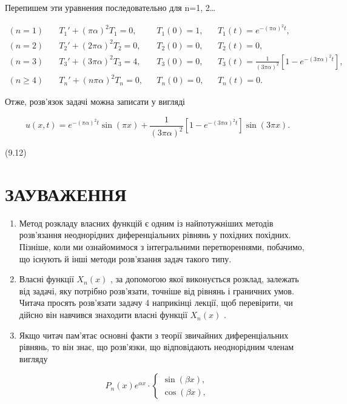 \documentclass[
  ukrainian,
]{article}
\begin{document}
Перепишем эти уравнения последовательно для n=1, 2\ldots{}

\[
\begin{aligned}
(n=1)\quad & T_1' + (\pi\alpha)^2 T_1 = 0, && T_1(0) = 1, && T_1(t) = e^{-(\pi\alpha)^2 t}, \\
(n=2)\quad & T_2' + (2\pi\alpha)^2 T_2 = 0, && T_2(0) = 0, && T_2(t) = 0, \\
(n=3)\quad & T_3' + (3\pi\alpha)^2 T_3 = 4, && T_3(0) = 0, && T_3(t) = \frac{1}{(3\pi\alpha)^2}\left[1 - e^{-(3\pi\alpha)^2 t}\right], \\
(n\geqslant 4)\quad & T_n' + (n\pi\alpha)^2 T_n = 0, && T_n(0) = 0, && T_n(t) = 0.
\end{aligned}
\]

Отже, розв'язок задачі можна записати у вигляді

\[u(x, t) = e^{-(\pi\alpha)^2 t} \sin(\pi x) + \frac{1}{(3\pi\alpha)^2} [1 - e^{-(3\pi\alpha)^2 t}] \sin(3\pi x).\]

(9.12)

\section{ЗАУВАЖЕННЯ}\label{ux437ux430ux443ux432ux430ux436ux435ux43dux43dux44f-6}

\begin{enumerate}
\def\labelenumi{\arabic{enumi}.}
\item
  Метод розкладу власних функцій є одним із найпотужніших методів
  розв'язання неоднорідних диференціальних рівнянь у похідних похідних.
  Пізніше, коли ми ознайомимося з інтегральними перетвореннями,
  побачимо, що існують й інші методи розв'язання задач такого типу.
\item
  Власні функції \(X_n(x)\) , за допомогою якої виконується розклад,
  залежать від задачі, яку потрібно розв'язати, точніше від рівнянь і
  граничних умов. Читача просять розв'язати задачу 4 наприкінці лекції,
  щоб перевірити, чи дійсно він навчився знаходити власні функції
  \(X_n(x)\) .
\item
  Якщо читач пам'ятає основні факти з теорії звичайних диференціальних
  рівнянь, то він знає, що розв'язки, що відповідають неоднорідним
  членам вигляду
\end{enumerate}

\[
P_n(x) e^{\alpha x} \cdot
\begin{cases} \sin{(\beta x)}, \\ \cos{(\beta x)}, \end{cases}
\]
\end{document}
